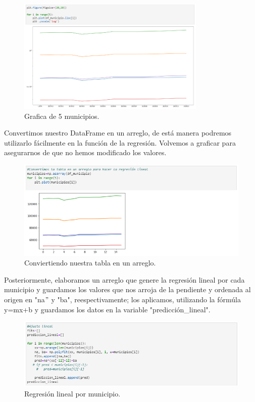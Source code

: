 \documentclass[12pt]{article}
\begin{document}
       \begin{figure}[h!] 
       \centering 
    \includegraphics[width=9cm]{Imagen5.png}
        \caption{Grafica de 5 municipios.}
        \label{fig:20}
         \end{figure}

Convertimos nuestro DataFrame en un arreglo, de está manera podremos utilizarlo fácilmente en la función de la regresión. Volvemos a graficar para asegurarnos de que no hemos modificado los valores. 

       \begin{figure}[h] 
       \centering 
    \includegraphics[width=12cm]{Imagen6.png}
        \caption{Conviertiendo nuestra tabla en un arreglo.}
        \label{fig:21}
         \end{figure} 
         

Posteriormente, elaboramos un arreglo que genere la regresión lineal por cada municipio y guardamos los valores que nos arroja de la pendiente y ordenada al origen en "na$"$ y "ba", reespectivamente;  los aplicamos, utilizando la fórmúla y=mx+b y guardamos los datos en la variable "predicción\_lineal".
       \begin{figure}[h] 
       \centering 
    \includegraphics[width=12cm]{Imagen7.png}
        \caption{Regresión lineal por municipio.}
        \label{fig:22}
         \end{figure} 
\end{document}

